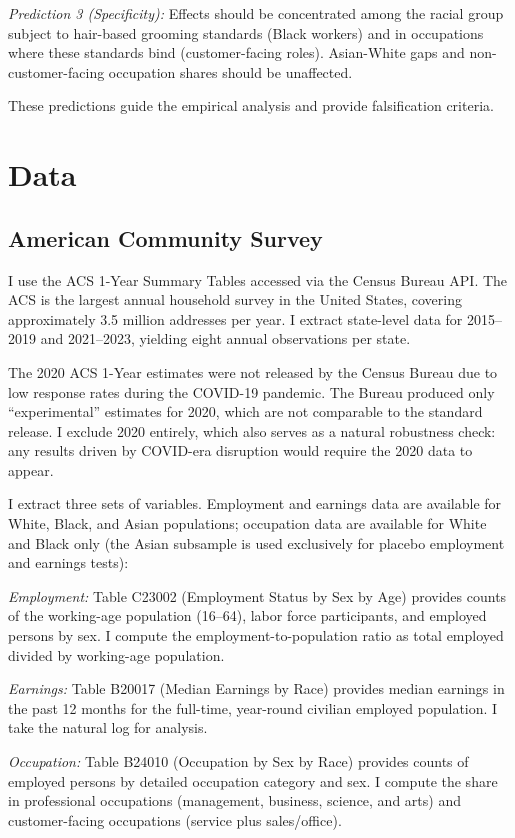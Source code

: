 \documentclass[12pt]{article}
\begin{document}
\textit{Prediction 3 (Specificity):} Effects should be concentrated among the racial group subject to hair-based grooming standards (Black workers) and in occupations where these standards bind (customer-facing roles). Asian-White gaps and non-customer-facing occupation shares should be unaffected.

These predictions guide the empirical analysis and provide falsification criteria.

\section{Data}\label{sec:data}

\subsection{American Community Survey}

I use the ACS 1-Year Summary Tables accessed via the Census Bureau API. The ACS is the largest annual household survey in the United States, covering approximately 3.5 million addresses per year. I extract state-level data for 2015--2019 and 2021--2023, yielding eight annual observations per state.

The 2020 ACS 1-Year estimates were not released by the Census Bureau due to low response rates during the COVID-19 pandemic. The Bureau produced only ``experimental'' estimates for 2020, which are not comparable to the standard release. I exclude 2020 entirely, which also serves as a natural robustness check: any results driven by COVID-era disruption would require the 2020 data to appear.

I extract three sets of variables. Employment and earnings data are available for White, Black, and Asian populations; occupation data are available for White and Black only (the Asian subsample is used exclusively for placebo employment and earnings tests):

\textit{Employment:} Table C23002 (Employment Status by Sex by Age) provides counts of the working-age population (16--64), labor force participants, and employed persons by sex. I compute the employment-to-population ratio as total employed divided by working-age population.

\textit{Earnings:} Table B20017 (Median Earnings by Race) provides median earnings in the past 12 months for the full-time, year-round civilian employed population. I take the natural log for analysis.

\textit{Occupation:} Table B24010 (Occupation by Sex by Race) provides counts of employed persons by detailed occupation category and sex. I compute the share in professional occupations (management, business, science, and arts) and customer-facing occupations (service plus sales/office).
\end{document}
